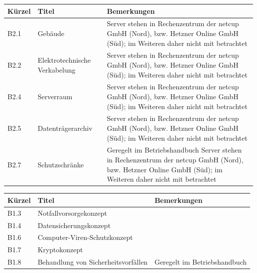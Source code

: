 \begin{minipage}{\textwidth}
\begin{center}
\begin{tabular}{p{1cm}p{5cm}p{9cm}}
\toprule
Kürzel 	& Titel & Bemerkungen \\
\midrule
B2.1 	& Gebäude & Server stehen in Rechenzentrum der netcup GmbH (Nord), bzw. Hetzner Online GmbH (Süd); im Weiteren daher nicht mit betrachtet \\
B2.2 	& Elektrotechnische \newline Verkabelung & Server stehen in Rechenzentrum der netcup GmbH (Nord), bzw. Hetzner Online GmbH (Süd); im Weiteren daher nicht mit betrachtet \\
B2.4 	& Serverraum & Server stehen in Rechenzentrum der netcup GmbH (Nord), bzw. Hetzner Online GmbH (Süd); im Weiteren daher nicht mit betrachtet \\
B2.5 	& Datenträgerarchiv	& Server stehen in Rechenzentrum der netcup GmbH (Nord), bzw. Hetzner Online GmbH (Süd); im Weiteren daher nicht mit betrachtet \\
B2.7 	& Schutzschränke & Geregelt im Betriebshandbuch Server stehen in Rechenzentrum der netcup GmbH (Nord), bzw. Hetzner Online GmbH (Süd); im Weiteren daher nicht mit betrachtet \\
\bottomrule
\end{tabular}
\end{center}
\end{minipage}
\bigskip

\begin{minipage}{\textwidth}
\begin{center}
\begin{tabular}{p{1cm}p{5cm}p{9cm}}
\toprule
Kürzel 	& Titel & Bemerkungen \\
\midrule
B1.3 	& Notfallvorsorgekonzept & \\
B1.4 	& Datensicherungskonzept & \\
B1.6 	& Computer-Viren-Schutzkonzept & \\
B1.7 	& Kryptokonzept	& \\
B1.8 	& Behandlung von \newline Sicherheitsvorfällen & Geregelt im Betriebshandbuch \\
\bottomrule
\end{tabular}
\end{center}
\end{minipage}

